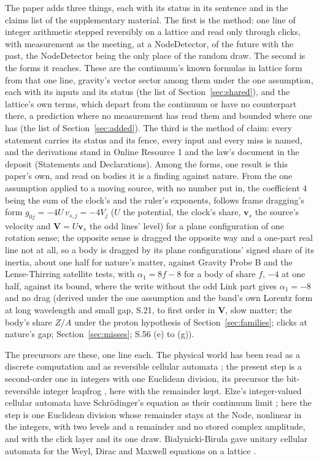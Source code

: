 \documentclass[pdflatex,sn-mathphys-num]{sn-jnl}
\theoremstyle{thmstyleone}
\theoremstyle{thmstyletwo}
\begin{document}
The paper adds three things, each with its status in its sentence and in the claims list of the supplementary material. The first is the method: one line of integer arithmetic stepped reversibly on a lattice and read only through clicks, with measurement as the meeting, at a NodeDetector, of the future with the past, the NodeDetector being the only place of the random draw. The second is the forms it reaches. These are the continuum's known formulas in lattice form from that one line, gravity's vector sector among them under the one assumption, each with its inputs and its status (the list of Section~\ref{sec:shared}), and the lattice's own terms, which depart from the continuum or have no counterpart there, a prediction where no measurement has read them and bounded where one has (the list of Section~\ref{sec:added}). The third is the method of claim: every statement carries its status and its fence, every input and every miss is named, and the derivations stand in Online Resource 1 and the law's document in the deposit (Statements and Declarations). Among the forms, one result is this paper's own, and read on bodies it is a finding against nature. From the one assumption applied to a moving source, with no number put in, the coefficient $4$ being the sum of the clock's and the ruler's exponents, follows frame dragging's form $g_{0j} = -4U\,v_{s,j} = -4V_j$ ($U$ the potential, the clock's share, $\mathbf v_s$ the source's velocity and $\mathbf V = U\mathbf v_s$ the odd lines' level) for a plane configuration of one rotation sense; the opposite sense is dragged the opposite way and a one-part real line not at all, so a body is dragged by its plane configurations' signed share of its inertia, about one half for nature's matter, against Gravity Probe B and the Lense-Thirring satellite tests, with $\alpha_1 = 8f - 8$ for a body of share $f$, $-4$ at one half, against its bound, where the write without the odd Link part gives $\alpha_1 = -8$ and no drag (derived under the one assumption and the band's own Lorentz form at long wavelength and small gap, S.21, to first order in $\mathbf V$, slow matter; the body's share $Z / A$ under the proton hypothesis of Section~\ref{sec:families}; clicks at nature's gap; Section~\ref{sec:misses}; S.56 (e) to (g)).

The precursors are these, one line each. The physical world has been read as a discrete computation \cite{zuse} and as reversible cellular automata \cite{toffoli}; the present step is a second-order one in integers with one Euclidean division, its precursor the bit-reversible integer leapfrog \cite{earn}, here with the remainder kept. Elze's integer-valued cellular automata have Schr\"odinger's equation as their continuum limit \cite{elze}; here the step is one Euclidean division whose remainder stays at the Node, nonlinear in the integers, with two levels and a remainder and no stored complex amplitude, and with the click layer and its one draw. Bialynicki-Birula gave unitary cellular automata for the Weyl, Dirac and Maxwell equations on a lattice \cite{bialynicki}.
\end{document}
